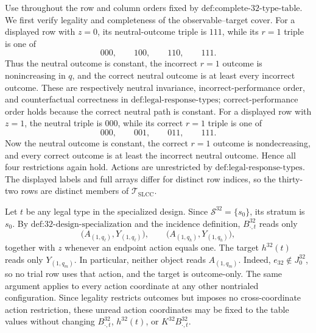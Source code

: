 Use throughout the row and column orders fixed by \(\text{def:complete-32-type-table}\).  We first verify legality and completeness of the observable--target cover.  For a displayed row with \(z=0\), its neutral-outcome triple is \(111\), while its \(r=1\) triple is one of
\[
000,\qquad 100,\qquad 110,\qquad 111.
\tag{1}
\]
Thus the neutral outcome is constant, the incorrect \(r=1\) outcome is nonincreasing in \(q\), and the correct neutral outcome is at least every incorrect outcome.  These are respectively neutral invariance, incorrect-performance order, and counterfactual correctness in \(\text{def:legal-response-types}\); correct-performance order holds because the correct neutral path is constant.  For a displayed row with \(z=1\), the neutral triple is \(000\), while its correct \(r=1\) triple is one of
\[
000,\qquad 001,\qquad 011,\qquad 111.
\tag{2}
\]
Now the neutral outcome is constant, the correct \(r=1\) outcome is nondecreasing, and every correct outcome is at least the incorrect neutral outcome.  Hence all four restrictions again hold.  Actions are unrestricted by \(\text{def:legal-response-types}\).  The displayed labels and full arrays differ for distinct row indices, so the thirty-two rows are distinct members of \(\mathcal T_{\mathrm{SLCC}}\).

Let \(t\) be any legal type in the specialized design.  Since \(\mathcal S^{32}=\{s_0\}\), its stratum is \(s_0\).  By \(\text{def:32-design-specialization}\) and the incidence definition, \(B^{32}_{\cdot,t}\) reads only
\[
\bigl(A_{(1,q_\ell)},Y_{(1,q_\ell)}\bigr),
\qquad
\bigl(A_{(1,q_h)},Y_{(1,q_h)}\bigr),
\tag{3}
\]
together with \(z\) whenever an endpoint action equals one.  The target \(h^{32}(t)\) reads only \(Y_{(1,q_m)}\).  In particular, neither object reads \(A_{(1,q_m)}\).  Indeed, \(e_{32}\notin J^{32}_0\), so no trial row uses that action, and the target is outcome-only.  The same argument applies to every action coordinate at any other nontrialed configuration.  Since legality restricts outcomes but imposes no cross-coordinate action restriction, these unread action coordinates may be fixed to the table values without changing \(B^{32}_{\cdot,t}\), \(h^{32}(t)\), or \(K^{32}B^{32}_{\cdot,t}\).

